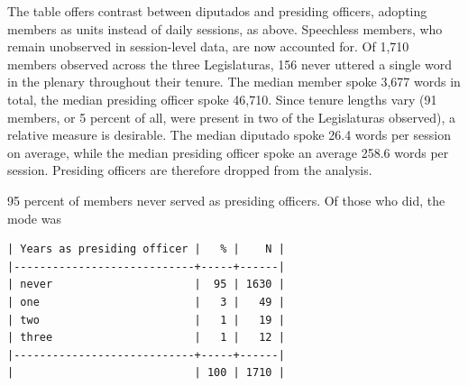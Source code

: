 \documentclass[letter,12pt]{article}
\begin{document}
The table offers contrast between diputados and presiding officers, adopting members as units instead of daily sessions, as above. Speechless members, who remain unobserved in session-level data, are now accounted for. Of 1,710 members observed across the three Legislaturas, 156 never uttered a single word in the plenary throughout their tenure. The median member spoke 3,677 words in total, the median presiding officer spoke 46,710. Since tenure lengths vary (91 members, or 5 percent of all, were present in two of the Legislaturas observed), a relative measure is desirable. The median diputado spoke 26.4 words per session on average, while the median presiding officer spoke an average 258.6 words per session. Presiding officers are therefore dropped from the analysis. 

95 percent of members never served as presiding officers. Of those who did, the mode was 

\singlespacing
\begin{footnotesize}
\begin{verbatim}
| Years as presiding officer |   % |    N |
|----------------------------+-----+------|
| never                      |  95 | 1630 |
| one                        |   3 |   49 |
| two                        |   1 |   19 |
| three                      |   1 |   12 |
|----------------------------+-----+------|
|                            | 100 | 1710 |
\end{verbatim}
\end{footnotesize}
\doublespacing
\end{document}
